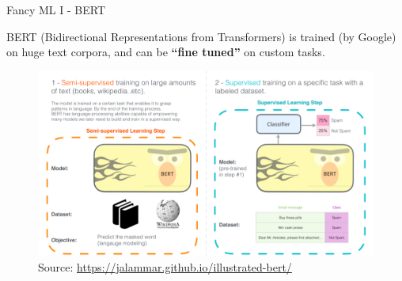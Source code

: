 \documentclass[9pt]{beamer}
\begin{document}
\begin{frame}{Fancy ML I - BERT}

BERT (Bidirectional Representations from Transformers) is trained (by Google) on huge text corpora, and can be \textbf{``fine tuned''} on custom tasks. 

\begin{figure}
	\includegraphics[width=\linewidth]{images/bert-transfer-learning.png}
	\caption{Source: \url{https://jalammar.github.io/illustrated-bert/}}
\end{figure}

\end{frame}
\end{document}
